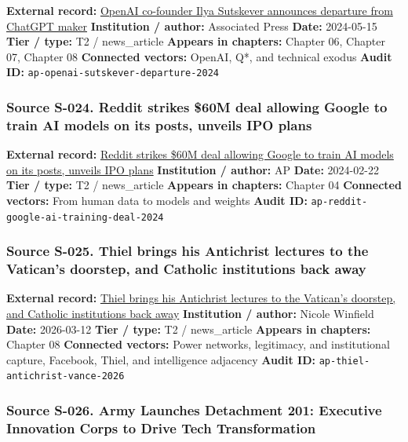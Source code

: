 \documentclass[
  american,
  11pt,
  letterpaper,
]{article}
\begin{document}
\textbf{External record:}
\href{https://apnews.com/article/419276b50007ad41adfd27764da3188c}{OpenAI
co-founder Ilya Sutskever announces departure from ChatGPT maker}
\textbf{Institution / author:} Associated Press \textbf{Date:}
2024-05-15 \textbf{Tier / type:} T2 / news\_article \textbf{Appears in
chapters:} Chapter 06, Chapter 07, Chapter 08 \textbf{Connected
vectors:} OpenAI, Q*, and technical exodus \textbf{Audit ID:}
\texttt{ap-openai-sutskever-departure-2024}

\subsubsection{Source S-024. Reddit strikes \$60M deal allowing Google
to train AI models on its posts, unveils IPO
plans}\label{source-s-024-reddit-strikes-60m-deal-allowing-google-to-train-ai-models-on-its-posts-unveils-ipo-plans}

\textbf{External record:}
\href{https://apnews.com/article/a7f131c7cb4225307134ef21d3c6a708}{Reddit
strikes \$60M deal allowing Google to train AI models on its posts,
unveils IPO plans} \textbf{Institution / author:} AP \textbf{Date:}
2024-02-22 \textbf{Tier / type:} T2 / news\_article \textbf{Appears in
chapters:} Chapter 04 \textbf{Connected vectors:} From human data to
models and weights \textbf{Audit ID:}
\texttt{ap-reddit-google-ai-training-deal-2024}

\subsubsection{Source S-025. Thiel brings his Antichrist lectures to the
Vatican's doorstep, and Catholic institutions back
away}\label{source-s-025-thiel-brings-his-antichrist-lectures-to-the-vaticans-doorstep-and-catholic-institutions-back-away}

\textbf{External record:}
\href{https://apnews.com/article/c3a6c7d2daba501caf8152558ac2d743}{Thiel
brings his Antichrist lectures to the Vatican's doorstep, and Catholic
institutions back away} \textbf{Institution / author:} Nicole Winfield
\textbf{Date:} 2026-03-12 \textbf{Tier / type:} T2 / news\_article
\textbf{Appears in chapters:} Chapter 08 \textbf{Connected vectors:}
Power networks, legitimacy, and institutional capture, Facebook, Thiel,
and intelligence adjacency \textbf{Audit ID:}
\texttt{ap-thiel-antichrist-vance-2026}

\subsubsection{Source S-026. Army Launches Detachment 201: Executive
Innovation Corps to Drive Tech
Transformation}\label{source-s-026-army-launches-detachment-201-executive-innovation-corps-to-drive-tech-transformation}
\end{document}
